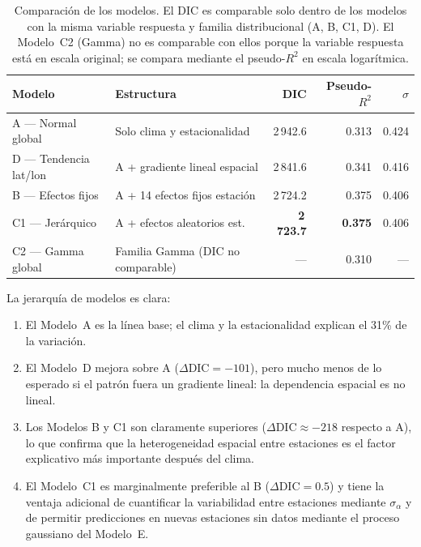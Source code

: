 \documentclass[12pt]{article}
\begin{document}
\begin{table}[H]
\centering
\caption{Comparaci\'on de los modelos.
         El DIC es comparable solo dentro de los modelos con la misma
         variable respuesta y familia distribucional (A, B, C1, D).
         El Modelo~C2 (Gamma) no es comparable con ellos porque la
         variable respuesta est\'a en escala original; se compara mediante
         el pseudo-$R^2$ en escala logar\'itmica.}
\label{tab:comparacion}
\small
\begin{tabular}{>{\raggedright\arraybackslash}p{3.5cm}>{\raggedright\arraybackslash}p{5cm}rrr}
\toprule
Modelo & Estructura & DIC & Pseudo-$R^2$ & $\sigma$ \\
\midrule
A --- Normal global     & Solo clima y estacionalidad      & 2\,942.6 & 0.313 & 0.424 \\
D --- Tendencia lat/lon & A + gradiente lineal espacial    & 2\,841.6 & 0.341 & 0.416 \\
B --- Efectos fijos     & A + 14 efectos fijos estaci\'on  & 2\,724.2 & 0.375 & 0.406 \\
C1 --- Jer\'arquico     & A + efectos aleatorios est.      & \textbf{2\,723.7} & \textbf{0.375} & 0.406 \\
\midrule
C2 --- Gamma global     & Familia Gamma (DIC no comparable)& ---  & 0.310 & --- \\
\bottomrule
\end{tabular}
\normalsize
\end{table}

La jerarqu\'ia de modelos es clara:
\begin{enumerate}
  \item El Modelo~A es la l\'inea base; el clima y la estacionalidad
        explican el 31\% de la variaci\'on.
  \item El Modelo~D mejora sobre A ($\Delta\text{DIC} = -101$), pero
        mucho menos de lo esperado si el patr\'on fuera un gradiente
        lineal: la dependencia espacial es no lineal.
  \item Los Modelos B y C1 son claramente superiores
        ($\Delta\text{DIC} \approx -218$ respecto a A), lo que confirma
        que la heterogeneidad espacial entre estaciones es
        el factor explicativo m\'as importante despu\'es del clima.
  \item El Modelo~C1 es marginalmente preferible al B
        ($\Delta\text{DIC} = 0.5$) y tiene la ventaja adicional de
        cuantificar la variabilidad entre estaciones mediante $\sigma_\alpha$
        y de permitir predicciones en nuevas estaciones sin datos mediante
        el proceso gaussiano del Modelo~E.
\end{enumerate}
\end{document}
